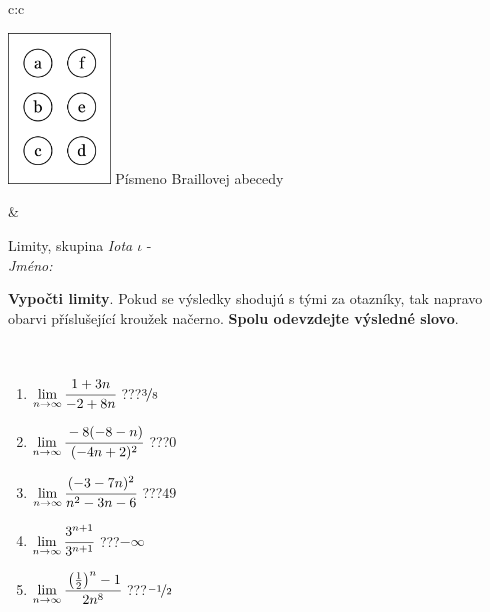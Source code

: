 \documentclass[10pt]{report}
\begin{document}
\begin{tabular}{c:c}
\begin{minipage}[c][104.5mm][t]{0.5\linewidth}
\begin{center}
\begin{minipage}{0.20\linewidth}
\begin{center}
\includegraphics[height=40mm]{../images/braille.png}
{\small Písmeno Braillovej abecedy}
\end{center}
\end{minipage}
\end{center}
\end{minipage}
&
\begin{minipage}[c][104.5mm][t]{0.5\linewidth}
\begin{center}
\vspace{7mm}
{\huge Limity, skupina \textit{Iota $\iota$} -}\\[5mm]
\textit{Jméno:}\phantom{xxxxxxxxxxxxxxxxxxxxxxxxxxxxxxxxxxxxxxxxxxxxxxxxxxxxxxxxxxxxxxxxx}\\[5mm]
\begin{minipage}{0.95\linewidth}
\begin{center}
\textbf{Vypočti limity}. Pokud se výsledky shodujú s tými za otazníky, tak napravo\\obarvi příslušející kroužek načerno. \textbf{Spolu odevzdejte výsledné slovo}.
\end{center}
\end{minipage}
\\[1mm]
\begin{minipage}{0.79\linewidth}
\begin{center}
\begin{varwidth}{\linewidth}
\begin{enumerate}
\normalsize
\item $\lim\limits_{n\to\infty}\cfrac{1+3n}{-2+8n}$\quad \dotfill\; ???\;\dotfill \quad $\nicefrac{3}{8}$
\item $\lim\limits_{n\to\infty}\cfrac{-8(-8-n)}{(-4n+2)^2}$\quad \dotfill\; ???\;\dotfill \quad $0$
\item $\lim\limits_{n\to\infty}\cfrac{(-3-7n)^2}{n^2-3n-6}$\quad \dotfill\; ???\;\dotfill \quad $49$
\item $\lim\limits_{n\to\infty}\cfrac{3^{n+1}}{3^{n+1}}$\quad \dotfill\; ???\;\dotfill \quad $-\infty$
\item $\lim\limits_{n\to\infty}\cfrac{\left(\frac{1}{2}\right)^n -1}{2n^{8}}$\quad \dotfill\; ???\;\dotfill \quad $\nicefrac{-1}{2}$

\end{enumerate}
\end{varwidth}
\end{center}
\end{minipage}
\end{center}
\end{minipage}
\end{tabular}
\end{document}
